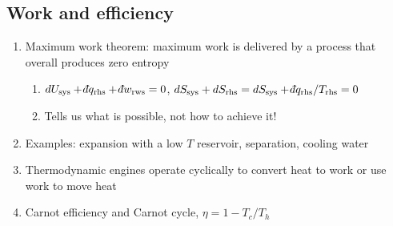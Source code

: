 \documentclass[11pt]{article}
\def\dbar{{\mathchar'26\mkern-12mu d}}
\begin{document}
\subsection{Work and efficiency}
\label{sec:org7fd7add}
\begin{enumerate}
\item Maximum work theorem: maximum work is delivered by a process that overall
produces zero entropy
\begin{enumerate}
\item \(dU_\text{sys}+\dbar q_\text{rhs} +\dbar w_\text{rws} =0\),
\(dS_\text{sys} + dS_\text{rhs}=dS_\text{sys} + \dbar q_\text{rhs}/T_\text{rhs}=0\)
\item Tells us what is possible, not how to achieve it!
\end{enumerate}
\item Examples: expansion with a low \(T\) reservoir, separation, cooling water
\item Thermodynamic engines operate cyclically to convert heat to work or use work to move heat
\item Carnot efficiency and Carnot cycle, \(\eta =1 - T_c/T_h\)
\end{enumerate}
\end{document}
